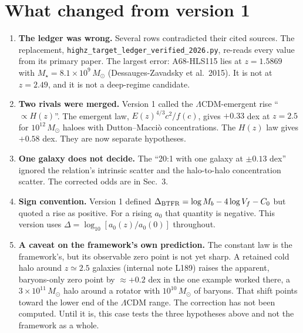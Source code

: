 \documentclass[11pt,letterpaper]{article}
\begin{document}
\section*{What changed from version 1}
\begin{enumerate}\itemsep2pt
\item \textbf{The ledger was wrong.} Several rows contradicted their cited sources. The replacement,
\texttt{highz\_target\_ledger\_verified\_2026.py}, re-reads every value from its primary paper. The largest error:
A68-HLS115 lies at $z=1.5869$ with $M_\star=8.1\times10^9\,M_\odot$ (Dessauges-Zavadsky et al.\ 2015). It is not at
$z=2.49$, and it is not a deep-regime candidate.
\item \textbf{Two rivals were merged.} Version 1 called the $\Lambda$CDM-emergent rise ``$\propto H(z)$''. The
emergent law, $E(z)^{4/3}c^2/f(c)$, gives $+0.33$ dex at $z=2.5$ for $10^{12}\,M_\odot$ haloes with Dutton--Macci\`o
concentrations. The $H(z)$ law gives $+0.58$ dex. They are now separate hypotheses.
\item \textbf{One galaxy does not decide.} The ``20:1 with one galaxy at $\pm0.13$ dex'' ignored the relation's
intrinsic scatter and the halo-to-halo concentration scatter. The corrected odds are in Sec.~3.
\item \textbf{Sign convention.} Version 1 defined $\Delta_{\rm BTFR}=\log M_b-4\log V_f-C_0$ but quoted a rise as
positive. For a rising $a_0$ that quantity is negative. This version uses $\Delta=\log_{10}[a_0(z)/a_0(0)]$
throughout.
\item \textbf{A caveat on the framework's own prediction.} The constant law is the framework's, but its observable
zero point is not yet sharp. A retained cold halo around $z\simeq2.5$ galaxies (internal note L189) raises the
apparent, baryons-only zero point by $\approx+0.2$ dex in the one example worked there, a $3\times10^{11}\,M_\odot$
halo around a rotator with $10^{10}\,M_\odot$ of baryons. That shift points toward the lower end of the
$\Lambda$CDM range. The correction has not been computed. Until it is, this case tests the three hypotheses above
and not the framework as a whole.
\end{enumerate}
\end{document}
